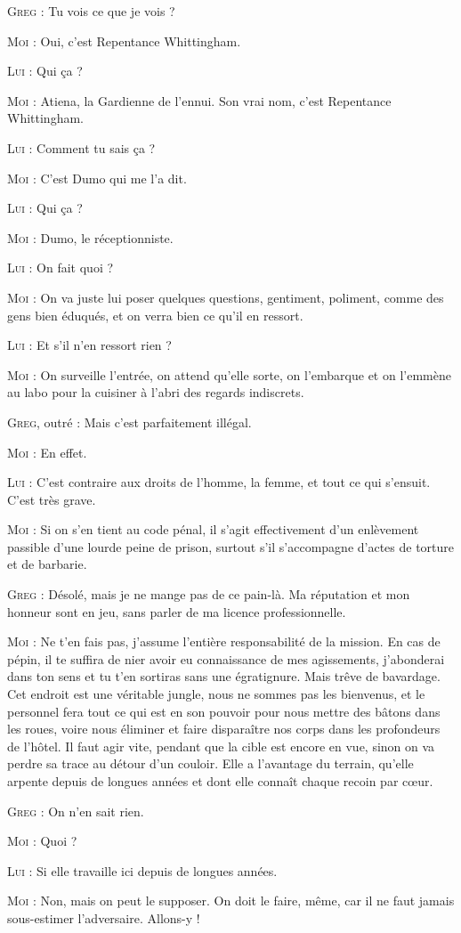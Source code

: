 \begin{dialogue}

\textsc{Greg} : Tu vois ce que je vois ?

\textsc{Moi} : Oui, c’est Repentance Whittingham.

\textsc{Lui} : Qui ça ?

\textsc{Moi} : Atiena, la Gardienne de l’ennui. Son vrai nom, c’est Repentance Whittingham.

\textsc{Lui} : Comment tu sais ça ?

\textsc{Moi} : C’est Dumo qui me l’a dit.

\textsc{Lui} : Qui ça ?

\textsc{Moi} : Dumo, le réceptionniste.

\textsc{Lui} : On fait quoi ?

\textsc{Moi} : On va juste lui poser quelques questions, gentiment, poliment, comme des gens bien éduqués, et on verra bien ce qu’il en ressort.

\textsc{Lui} : Et s’il n’en ressort rien ?

\textsc{Moi} : On surveille l’entrée, on attend qu’elle sorte, on l’embarque et on l’emmène au labo pour la cuisiner à l’abri des regards indiscrets.

\textsc{Greg}, outré : Mais c’est parfaitement illégal.

\textsc{Moi} : En effet.

\textsc{Lui} : C’est contraire aux droits de l’homme, la femme, et tout ce qui s’ensuit. C’est très grave.

\textsc{Moi} : Si on s’en tient au code pénal, il s’agit effectivement d’un enlèvement passible d’une lourde peine de prison, surtout s’il s’accompagne d’actes de torture et de barbarie.

\textsc{Greg} : Désolé, mais je ne mange pas de ce pain-là. Ma réputation et mon honneur sont en jeu, sans parler de ma licence professionnelle.

\textsc{Moi} : Ne t’en fais pas, j’assume l’entière responsabilité de la mission. En cas de pépin, il te suffira de nier avoir eu connaissance de mes agissements, j’abonderai dans ton sens et tu t’en sortiras sans une égratignure. Mais trêve de bavardage. Cet endroit est une véritable jungle, nous ne sommes pas les bienvenus, et le personnel fera tout ce qui est en son pouvoir pour nous mettre des bâtons dans les roues, voire nous éliminer et faire disparaître nos corps dans les profondeurs de l’hôtel. Il faut agir vite, pendant que la cible est encore en vue, sinon on va perdre sa trace au détour d’un couloir. Elle a l’avantage du terrain, qu’elle arpente depuis de longues années et dont elle connaît chaque recoin par cœur.

\textsc{Greg} : On n’en sait rien.

\textsc{Moi} : Quoi ?

\textsc{Lui} : Si elle travaille ici depuis de longues années.

\textsc{Moi} : Non, mais on peut le supposer. On doit le faire, même, car il ne faut jamais sous-estimer l’adversaire. Allons-y !

\end{dialogue}

